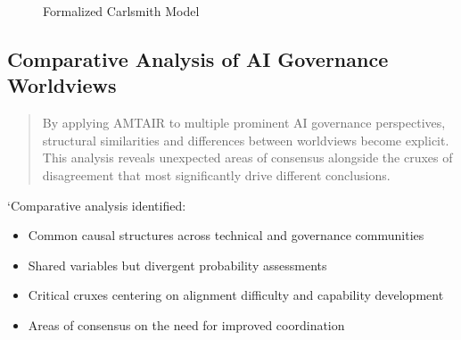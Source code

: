 \documentclass[12pt,a4paper]{report}
\providecommand{\tightlist}{%
  \setlength{\itemsep}{0pt}\setlength{\parskip}{0pt}}
\begin{document}
\begin{figure}


\caption{\label{fig-carlsmith-model}Formalized Carlsmith Model}

\end{figure}%

\subsection{Comparative Analysis of AI Governance
Worldviews}\label{sec-comparative-analysis}

\begin{quote}
By applying AMTAIR to multiple prominent AI governance perspectives,
structural similarities and differences between worldviews become
explicit. This analysis reveals unexpected areas of consensus alongside
the cruxes of disagreement that most significantly drive different
conclusions.
\end{quote}

`Comparative analysis identified:

\begin{itemize}
\tightlist
\item
  Common causal structures across technical and governance communities
\item
  Shared variables but divergent probability assessments
\item
  Critical cruxes centering on alignment difficulty and capability
  development
\item
  Areas of consensus on the need for improved coordination
\end{itemize}
\end{document}
